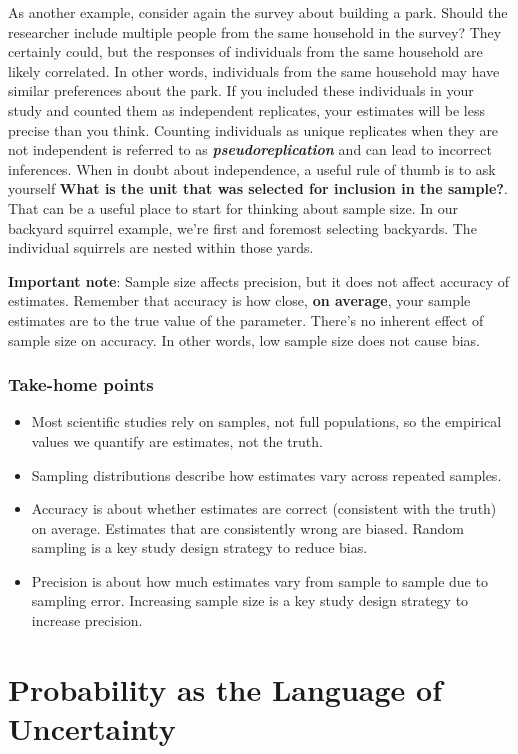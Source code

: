 \documentclass[
]{book}
\begin{document}
As another example, consider again the survey about building a park. Should the researcher include multiple people from the same household in the survey? They certainly could, but the responses of individuals from the same household are likely correlated. In other words, individuals from the same household may have similar preferences about the park. If you included these individuals in your study and counted them as independent replicates, your estimates will be less precise than you think. Counting individuals as unique replicates when they are not independent is referred to as \textbf{\emph{pseudoreplication}} and can lead to incorrect inferences. When in doubt about independence, a useful rule of thumb is to ask yourself \textbf{What is the unit that was selected for inclusion in the sample?}. That can be a useful place to start for thinking about sample size. In our backyard squirrel example, we're first and foremost selecting backyards. The individual squirrels are nested within those yards.

\textbf{Important note}: Sample size affects precision, but it does not affect accuracy of estimates. Remember that accuracy is how close, \textbf{on average}, your sample estimates are to the true value of the parameter. There's no inherent effect of sample size on accuracy. In other words, low sample size does not cause bias.

\subsection{Take-home points}\label{take-home-points}

\begin{itemize}
\item
  Most scientific studies rely on samples, not full populations, so the empirical values we quantify are estimates, not the truth.
\item
  Sampling distributions describe how estimates vary across repeated samples.
\item
  Accuracy is about whether estimates are correct (consistent with the truth) on average. Estimates that are consistently wrong are biased. Random sampling is a key study design strategy to reduce bias.
\item
  Precision is about how much estimates vary from sample to sample due to sampling error. Increasing sample size is a key study design strategy to increase precision.
\end{itemize}

\chapter{Probability as the Language of Uncertainty}\label{probability-as-the-language-of-uncertainty}
\end{document}
